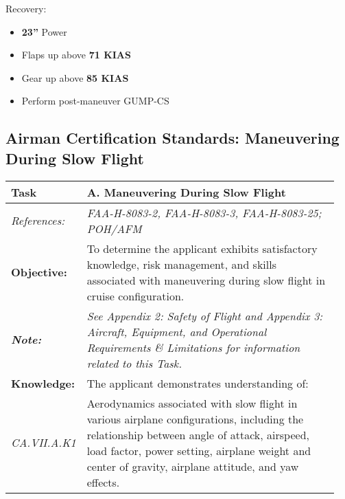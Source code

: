 {Recovery:
\begin{itemize}[label={}]
\item \textbf{23''} Power
\item Flaps up above \textbf{71 KIAS}
\item Gear up above \textbf{85 KIAS}
\item Perform post-maneuver GUMP-CS
\end{itemize}

\newpage
\subsection{Airman Certification Standards: Maneuvering During Slow Flight}
\begin{table}[H]
\begin{tabular}%
  {>{\raggedleft\arraybackslash}p{0.15\linewidth}%
   >{\raggedright\arraybackslash}p{0.8\linewidth}%
  }
\textbf{Task}             & \textbf{A. Maneuvering During Slow Flight}                                                                                                                                                                                                        \\ \hline
\textit{References:}      & \textit{FAA-H-8083-2, FAA-H-8083-3, FAA-H-8083-25; POH/AFM}                                                                                                                                                                                       \\
\textbf{Objective:}       & To determine the applicant exhibits satisfactory knowledge, risk management, and skills associated with maneuvering during slow flight in cruise configuration.                                                                                   \\
\textit{\textbf{Note:}}   & \textit{See Appendix 2: Safety of Flight and Appendix 3: Aircraft, Equipment, and Operational Requirements \& Limitations for information related to this Task.}                                                                                  \\ \hline
\textbf{Knowledge:}       & The applicant demonstrates understanding of:                                                                                                                                                                                                      \\
\textit{CA.VII.A.K1}      & Aerodynamics associated with slow flight in various airplane configurations, including the relationship between angle of attack, airspeed, load factor, power setting, airplane weight and center of gravity, airplane attitude, and yaw effects. \\ \hline

\end{tabular}
\end{table}}
